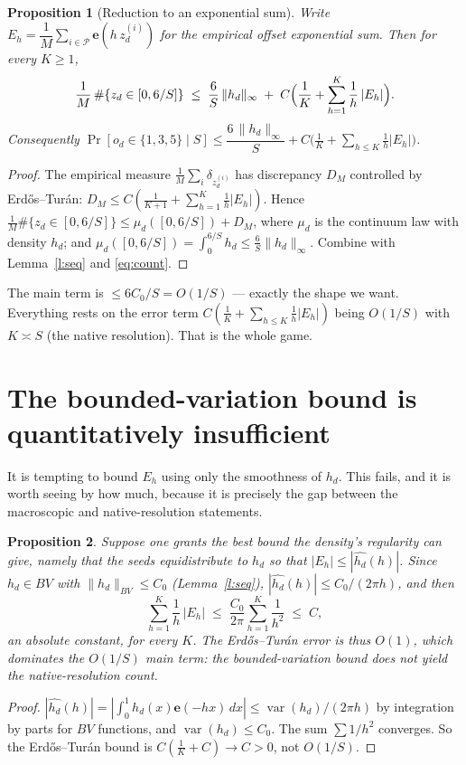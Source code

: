 \documentclass[11pt]{article}
\newtheorem{proposition}{Proposition}\newtheorem{corollary}{Corollary}
\theoremstyle{remark}\newtheorem{remark}{Remark}
\newcommand{\e}{\mathbf e}\newcommand{\Lop}{\mathcal L}\newcommand{\var}{\operatorname{var}}
\begin{document}
\begin{proposition}[Reduction to an exponential sum]\label{p:ET}
Write $E_h=\dfrac1M\sum_{i\in\mathcal P}\e(h\,z_d^{(i)})$ for the empirical
offset exponential sum. Then for every $K\ge1$,
\[
\frac1M\,\#\{z_d\in[0,6/S]\}\;\le\;\frac{6}{S}\,\|h_d\|_\infty
\;+\;C\Bigl(\frac1K+\sum_{h=1}^{K}\frac1h\,|E_h|\Bigr).
\]
Consequently $\Pr[o_d\in\{1,3,5\}\mid S]\le \dfrac{6\,\|h_d\|_\infty}{S}
+C\bigl(\tfrac1K+\sum_{h\le K}\tfrac1h|E_h|\bigr)$.
\end{proposition}
\begin{proof}
The empirical measure $\tfrac1M\sum_i\delta_{z_d^{(i)}}$ has discrepancy $D_M$
controlled by Erd\H os--Tur\'an: $D_M\le C(\tfrac1{K+1}+\sum_{h=1}^K\tfrac1h|E_h|)$.
Hence $\tfrac1M\#\{z_d\in[0,6/S]\}\le\mu_d([0,6/S])+D_M$, where $\mu_d$ is the
continuum law with density $h_d$; and
$\mu_d([0,6/S])=\int_0^{6/S}h_d\le\tfrac6S\|h_d\|_\infty$. Combine with
Lemma~\ref{l:seq} and \eqref{eq:count}.
\end{proof}

The main term is $\le 6C_0/S=O(1/S)$ --- exactly the shape we want. Everything
rests on the error term $C(\tfrac1K+\sum_{h\le K}\tfrac1h|E_h|)$ being $O(1/S)$
with $K\asymp S$ (the native resolution). That is the whole game.

\section{The bounded-variation bound is quantitatively insufficient}
It is tempting to bound $E_h$ using only the smoothness of $h_d$. This fails,
and it is worth seeing by how much, because it is precisely the gap between the
macroscopic and native-resolution statements.

\begin{proposition}\label{p:insufficient}
Suppose one grants the best bound the density's regularity can give, namely that
the seeds equidistribute to $h_d$ so that $|E_h|\le|\widehat{h_d}(h)|$. Since
$h_d\in BV$ with $\|h_d\|_{BV}\le C_0$ (Lemma~\ref{l:seq}),
$|\widehat{h_d}(h)|\le C_0/(2\pi h)$, and then
\[
\sum_{h=1}^{K}\frac1h\,|E_h|\;\le\;\frac{C_0}{2\pi}\sum_{h=1}^{K}\frac1{h^2}\;\le\;C,
\]
an \emph{absolute constant}, for every $K$. The Erd\H os--Tur\'an error is thus
$O(1)$, which dominates the $O(1/S)$ main term: the bounded-variation bound does
\emph{not} yield the native-resolution count.
\end{proposition}
\begin{proof}
$|\widehat{h_d}(h)|=|\int_0^1 h_d(x)\e(-hx)\,dx|\le\var(h_d)/(2\pi h)$ by
integration by parts for $BV$ functions, and $\var(h_d)\le C_0$. The sum
$\sum 1/h^2$ converges. So the Erd\H os--Tur\'an bound is
$C(\tfrac1K+C)\to C>0$, not $O(1/S)$.
\end{proof}
\end{document}
